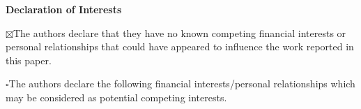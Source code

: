 \documentclass[11pt]{article}
\begin{document}
\begin{center}
    {\Large\bfseries Declaration of Interests}
\end{center}

\vspace{1em}

\noindent
$\boxtimes$\quad The authors declare that they have no known competing financial interests or personal relationships that could have appeared to influence the work reported in this paper.

\vspace{1em}

\noindent
$\square$\quad The authors declare the following financial interests/personal relationships which may be considered as potential competing interests.
\end{document}
